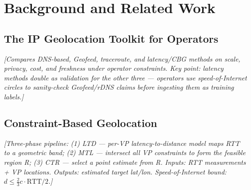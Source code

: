 \section{Background and Related Work}
\label{sec:background}

%

\subsection{The IP Geolocation Toolkit for Operators}
\label{sec:background-toolkit}
\textit{[Compares DNS-based, Geofeed, traceroute, and latency/CBG methods on scale, privacy, cost,
and freshness under operator constraints. Key point: latency methods double as validation for the
other three — operators use speed-of-Internet circles to sanity-check Geofeed/rDNS claims before
ingesting them as training labels.]}

\subsection{Constraint-Based Geolocation}
\label{sec:background-cbg}
\textit{[Three-phase pipeline: (1) LTD — per-VP latency-to-distance model maps RTT to a
geometric band; (2) MTL — intersect all VP constraints to form the feasible region R;
(3) CTR — select a point estimate from R. Inputs: RTT measurements + VP locations.
Outputs: estimated target lat/lon. Speed-of-Internet bound: $d \leq \frac{2}{3}c \cdot \text{RTT}/2$.]}

